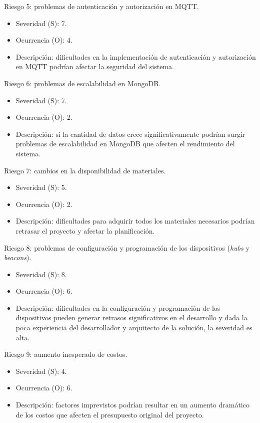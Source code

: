 \documentclass[
11pt, %
]{charter}
\begin{document}
Riesgo 5: problemas de autenticación y autorización en MQTT.
\begin{itemize}
	\item Severidad (S): 7.
	\item Ocurrencia (O): 4.
	\item Descripción: dificultades en la implementación de autenticación y autorización en MQTT podrían afectar la seguridad del sistema.
\end{itemize}

Riesgo 6: problemas de escalabilidad en MongoDB.
\begin{itemize}
	\item Severidad (S): 7.
	\item Ocurrencia (O): 2.
	\item Descripción: si la cantidad de datos crece significativamente podrían surgir problemas de escalabilidad en MongoDB que afecten el rendimiento del sistema.
\end{itemize}

Riesgo 7: cambios en la disponibilidad de materiales.
\begin{itemize}
	\item Severidad (S): 5.
	\item Ocurrencia (O): 2.
	\item Descripción: dificultades para adquirir todos los materiales necesarios podrían retrasar el proyecto y afectar la planificación.
\end{itemize}

Riesgo 8: problemas de configuración y programación de los dispositivos (\textit{hubs} y \textit{beacons}).
\begin{itemize}
	\item Severidad (S): 8.
	\item Ocurrencia (O): 6.
	\item Descripción: dificultades en la configuración y programación de los dispositivos pueden generar retrasos significativos en el desarrollo y dada la poca experiencia del desarrollador y arquitecto de la solución, la severidad es alta.
\end{itemize}

Riesgo 9: aumento inesperado de costos.
\begin{itemize}
	\item Severidad (S): 4.
	\item Ocurrencia (O): 6.
	\item Descripción: factores imprevistos podrían resultar en un aumento dramático de los costos que afecten el presupuesto original del proyecto.
\end{itemize}
\end{document}
